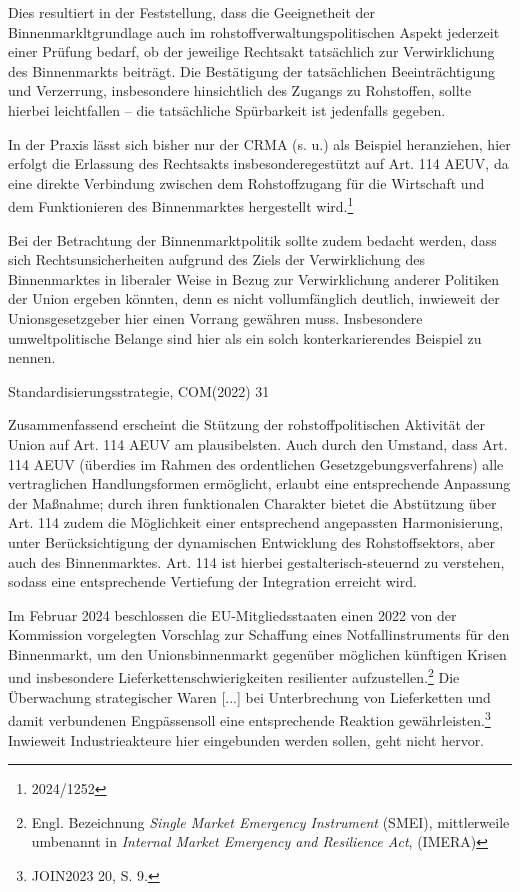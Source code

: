 \documentclass[12pt,a4paper,oneside]{book} %
\begin{document}
Dies resultiert in der Feststellung, dass die Geeignetheit der Binnenmarkltgrundlage auch im rohstoffverwaltungspolitischen Aspekt jederzeit einer Prüfung bedarf, ob der jeweilige Rechtsakt tatsächlich zur Verwirklichung des Binnenmarkts beiträgt. Die Bestätigung der tatsächlichen Beeinträchtigung und Verzerrung, insbesondere hinsichtlich des Zugangs zu Rohstoffen, sollte hierbei leichtfallen -- die tatsächliche Spürbarkeit ist jedenfalls gegeben.
	
In der Praxis lässt sich bisher nur der CRMA (s. u.) als Beispiel heranziehen, hier erfolgt die Erlassung des Rechtsakts \grqq insbesondere\glqq gestützt auf Art. 114 AEUV, da eine direkte Verbindung zwischen dem Rohstoffzugang für die Wirtschaft und dem Funktionieren des Binnenmarktes hergestellt wird.\footnote{2024/1252}
	
Bei der Betrachtung der Binnenmarktpolitik sollte zudem bedacht werden, dass sich Rechtsunsicherheiten aufgrund des Ziels der Verwirklichung des Binnenmarktes in liberaler Weise in Bezug zur Verwirklichung anderer Politiken der Union ergeben könnten, denn es nicht vollumfänglich deutlich, inwieweit der Unionsgesetzgeber hier einen Vorrang gewähren muss.\autocite[§23 Rn 10]{classen_europarecht_2021} Insbesondere umweltpolitische Belange sind hier als ein solch konterkarierendes Beispiel zu nennen.
	
	
Standardisierungsstrategie, COM(2022) 31
	
Zusammenfassend erscheint die Stützung der rohstoffpolitischen Aktivität der Union auf Art. 114 AEUV am plausibelsten. Auch durch den Umstand, dass Art. 114 AEUV (überdies im Rahmen des ordentlichen Gesetzgebungsverfahrens) alle vertraglichen Handlungsformen ermöglicht, erlaubt eine entsprechende Anpassung der Maßnahme; durch ihren funktionalen Charakter bietet die Abstützung über Art. 114 zudem die Möglichkeit einer entsprechend angepassten Harmonisierung, unter Berücksichtigung der dynamischen Entwicklung des Rohstoffsektors, aber auch des Binnenmarktes. Art. 114 ist hierbei gestalterisch-steuernd zu verstehen, sodass eine entsprechende Vertiefung der Integration erreicht wird.\autocite{Grabitz/Hilf/Nettesheim/Tietje AEUV Art. 114 Rn. 34}

Im Februar 2024 beschlossen die EU-Mitgliedsstaaten einen 2022 von der Kommission vorgelegten Vorschlag zur Schaffung eines \glqq Notfallinstruments für den Binnenmarkt\grqq, um den Unionsbinnenmarkt gegenüber möglichen künftigen Krisen und insbesondere Lieferkettenschwierigkeiten resilienter aufzustellen.\footnote{Engl. Bezeichnung \textit{Single Market Emergency Instrument} (SMEI), mittlerweile umbenannt in \textit{Internal Market Emergency and Resilience Act}, (IMERA)}
Die \glqq Überwachung strategischer Waren [...] bei Unterbrechung von Lieferketten und damit verbundenen Engpässen\grqq soll eine entsprechende Reaktion gewährleisten.\footnote{JOIN2023 20, S. 9.} Inwieweit Industrieakteure hier eingebunden werden sollen, geht nicht hervor.
\end{document}
